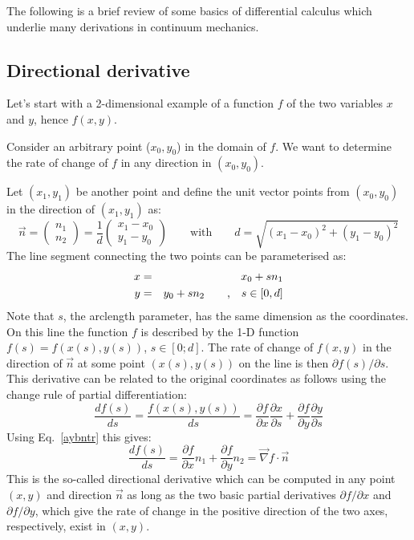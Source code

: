 
The following is a brief review of some basics of differential calculus which underlie many
derivations in continuum mechanics.

\subsection{Directional derivative}

Let's start with a 2-dimensional example of a function $f$ of the two variables $x$ and $y$, hence
$f(x,y)$.

Consider an arbitrary point ($x_0,y_0$) in the domain of $f$. 
We want to determine the rate of change of $f$ in any direction in $(x_0,y_0)$.

Let $(x_1,y_1)$ be another point and define the unit vector
points from $(x_0,y_0)$ in the direction of $(x_1,y_1)$ as:
\[
\vec{n} = 
\left(
\begin{array}{c}
n_1 \\ n_2
\end{array}
\right)
=
\frac{1}{d}
\left(
\begin{array}{c}
x_1-x_0 \\ 
y_1-y_0
\end{array}
\right)
\qquad\text{with}\qquad
d=\sqrt{(x_1-x_0)^2+(y_1-y_0)^2}
\]
The line segment connecting the two points can be
parameterised as:
\begin{eqnarray}
x &=& x_0 + s n_1 \nonumber\\
y &=& y_0 + s n_2 \qquad \text{,} \quad s\in[0,d]
\label{aybntr}
\end{eqnarray}
Note that $s$, the arclength parameter, has the same dimension as the coordinates. On this
line the function $f$ is described by the 1-D function $f(s) = f(x(s), y(s))$, $s \in [0;d]$. 
The rate of change of $f(x,y)$ in the direction of $\vec{n}$ at some point $(x(s),y(s))$ 
on the line is then $\partial f(s)/\partial s$. 
This derivative can be related to the original coordinates as follows using the change
rule of partial differentiation:
\[
\frac{d f(s)}{d s}
=
\frac{f(x(s),y(s))}{ds}
=
\frac{\partial f}{\partial x}
\frac{\partial x}{\partial s}
+
\frac{\partial f}{\partial y}
\frac{\partial y}{\partial s}
\]
Using Eq.~\eqref{aybntr} this gives:
\begin{equation}
\frac{d f(s)}{d s}
=
\frac{\partial f}{\partial x} n_1
+
\frac{\partial f}{\partial y} n_2
=
\vec\nabla f \cdot \vec{n}
\label{sgeoete}
\end{equation}
This is the so-called directional derivative which can be computed in any point $(x,y)$ and
direction $\vec{n}$ as long as the two basic partial derivatives 
$\partial f/\partial x$ and $\partial f/\partial y$, which give the rate of
change in the positive direction of the two axes, respectively, exist in $(x,y)$.

